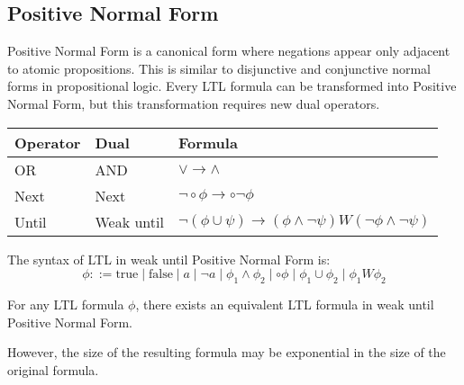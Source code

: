 \subsection{Positive Normal Form}
Positive Normal Form is a canonical form where negations appear only adjacent to atomic propositions. 
This is similar to disjunctive and conjunctive normal forms in propositional logic.
Every LTL formula can be transformed into Positive Normal Form, but this transformation requires new dual operators.
\begin{table}[H]
    \centering
    \begin{tabular}{|l|l|l|}
    \hline
    \textbf{Operator} & \textbf{Dual} & \textbf{Formula} \\ \hline
    OR                & AND           & $\lor\rightarrow\land$                \\ \hline
    Next              & Next          & $\lnot\circ\phi\rightarrow\circ\lnot\phi$                 \\ \hline
    Until             & Weak until    & $\lnot(\phi\cup\psi)\rightarrow(\phi\land\lnot\psi)W(\lnot\phi\land\lnot\psi)$                \\ \hline
    \end{tabular}
\end{table}
The syntax of LTL in weak until Positive Normal Form is:
\[\phi::=\text{true}\mid\text{false}\mid a \mid\lnot a\mid \phi_1\land\phi_2\mid\circ\phi\mid\phi_1\cup\phi_2\mid\phi_1 W\phi_2\]
\begin{theorem}
    For any LTL formula $\phi$, there exists an equivalent LTL formula in weak until Positive Normal Form. 
\end{theorem}
\noindent However, the size of the resulting formula may be exponential in the size of the original formula.

